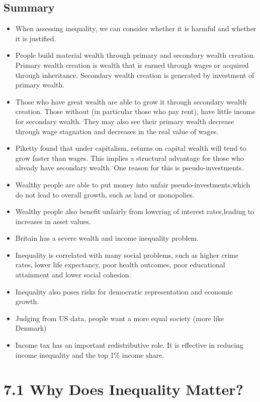 \documentclass[]{tufte-handout}
\providecommand{\tightlist}{%
  \setlength{\itemsep}{0pt}\setlength{\parskip}{0pt}}
\begin{document}
\hypertarget{summary}{%
\subsection{Summary}\label{summary}}

\begin{itemize}
\tightlist
\item
  When assessing inequality, we can consider whether it is harmful and
  whether it is justified.
\item
  People build material wealth through primary and secondary wealth
  creation. Primary wealth creation is wealth that is earned through
  wages or acquired through inheritance. Secondary wealth creation is
  generated by investment of primary wealth.
\item
  Those who have great wealth are able to grow it through secondary
  wealth creation. Those without (in particular those who pay rent),
  have little income for secondary wealth. They may also see their
  primary wealth decrease through wage stagnation and decreases in the
  real value of wages.
\item
  Piketty found that under capitalism, returns on capital wealth will
  tend to grow faster than wages. This implies a structural advantage
  for those who already have secondary wealth. One reason for this is
  pseudo-investments.
\item
  Wealthy people are able to put money into unfair
  pseudo-investments,which do not lead to overall growth, such as land
  or monopolies.
\item
  Wealthy people also benefit unfairly from lowering of interest
  rates,leading to increases in asset values.
\item
  Britain has a severe wealth and income inequality problem.
\item
  Inequality is correlated with many social problems, such as higher
  crime rates, lower life expectancy, poor health outcomes, poor
  educational attainment and lower social cohesion.
\item
  Inequality also poses risks for democratic representation and economic
  growth.
\item
  Judging from US data, people want a more equal society (more like
  Denmark)
\item
  Income tax has an important redistributive role. It is effective in
  reducing income inequality and the top 1\% income share.
\end{itemize}

\hypertarget{why-does-inequality-matter}{%
\section{7.1 Why Does Inequality
Matter?}\label{why-does-inequality-matter}}
\end{document}
